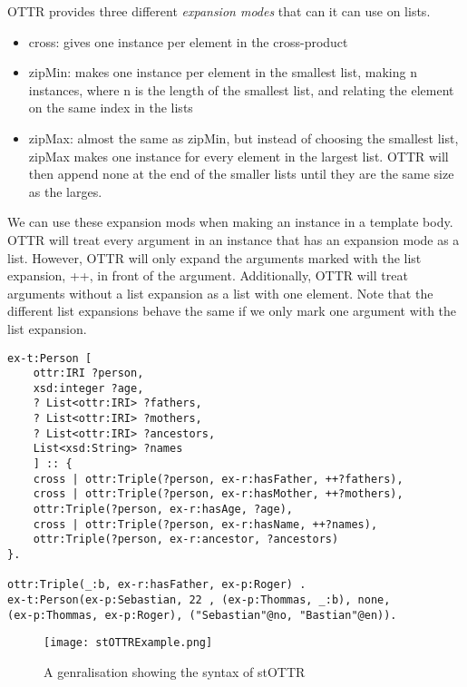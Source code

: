 \para
OTTR provides three different \emph{expansion modes} that can it can use on lists.
\begin{itemize}
    \item cross: gives one instance per element in the cross-product
    \item zipMin: makes one instance per element in the smallest list, making n instances, where n is the length of the smallest list, and relating the element on the same index in the lists
    \item zipMax:  almost the same as zipMin, but instead of choosing the smallest list, zipMax makes one instance for every element in the largest list. OTTR will then append none at the end of the smaller lists until they are the same size as the larges. 
\end{itemize}
We can use these expansion mods when making an instance in a template body. OTTR will treat every argument in an instance that has an expansion mode as a list. However, OTTR will only expand the arguments marked with the list expansion, ++, in front of the argument. Additionally, OTTR will treat arguments without a list expansion as a list with one element. Note that the different list expansions behave the same if we only mark one argument with the list expansion. 

\begin{lstlisting}[frame=single]
ex-t:Person [
    ottr:IRI ?person,
    xsd:integer ?age,
    ? List<ottr:IRI> ?fathers,
    ? List<ottr:IRI> ?mothers,
    ? List<ottr:IRI> ?ancestors,
    List<xsd:String> ?names
    ] :: {
    cross | ottr:Triple(?person, ex-r:hasFather, ++?fathers),
    cross | ottr:Triple(?person, ex-r:hasMother, ++?mothers),
    ottr:Triple(?person, ex-r:hasAge, ?age),
    cross | ottr:Triple(?person, ex-r:hasName, ++?names),
    ottr:Triple(?person, ex-r:ancestor, ?ancestors)
}.

ottr:Triple(_:b, ex-r:hasFather, ex-p:Roger) .
ex-t:Person(ex-p:Sebastian, 22 , (ex-p:Thommas, _:b), none, 
(ex-p:Thommas, ex-p:Roger), ("Sebastian"@no, "Bastian"@en)).
\end{lstlisting}

\begin{figure}
    \centering
    \texttt{[image: stOTTRExample.png]}
    \caption{A genralisation showing the syntax of stOTTR}
    \label{fig:stOTTERGenralisation}
\end{figure}

